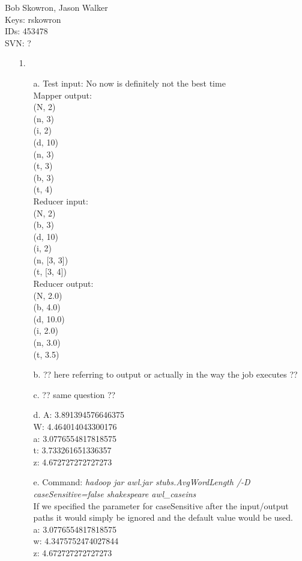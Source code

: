 \documentclass{article}
\begin{document}
\begin{flushright}
Bob Skowron, Jason Walker\\
Keys: rskowron\\
IDs: 453478\\
SVN: ?\\
\end{flushright}

\begin{itemize}
\item[1.] 
	\begin{itemize}
	\item[a.] Test input: No now is definitely not the best time \\
		Mapper output:\\
			(N, 2)\\
			(n, 3)\\
			(i, 2)\\
			(d, 10)\\
			(n, 3)\\
			(t, 3)\\
			(b, 3)\\
			(t, 4)\\
		Reducer input:\\
			(N, 2)\\
			(b, 3)\\
			(d, 10)\\
			(i, 2)\\
			(n, [3, 3])\\	
			(t, [3, 4])\\
		Reducer output:\\
			(N, 2.0)\\
			(b, 4.0)\\
			(d, 10.0)\\
			(i, 2.0)\\
			(n, 3.0)\\
			(t, 3.5)\\
	\item[b.] ?? here referring to output or actually in the way the job executes ??
	\item[c.] ?? same question ??
	\item[d.] %
		A: 3.891394576646375\\
		W: 4.464014043300176\\
		a: 3.0776554817818575\\
		t: 3.733261651336357\\
		z: 4.672727272727273\\
	\item[e.] 
		Command: \textit{hadoop jar awl.jar stubs.AvgWordLength /-D caseSensitive=false shakespeare awl\_caseins} \\
		If we specified the parameter for caseSensitive after the input/output paths it would simply be ignored and the default value would be used.\\
		a: 3.0776554817818575\\
		w: 4.3475752474027844\\
		z: 4.672727272727273\\
	\end{itemize}
\end{itemize}
\end{document}
